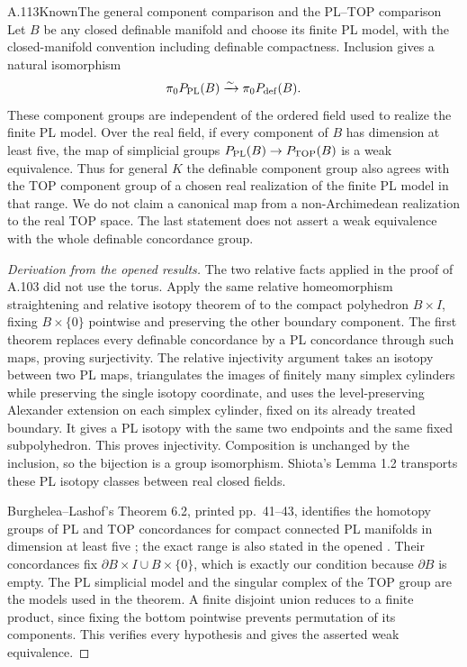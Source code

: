 \begin{saresult}{A.113}{Known}{The general component comparison and the PL--TOP comparison}
Let $B$ be any closed definable manifold and choose its finite PL
model, with the closed-manifold convention including definable
compactness. Inclusion gives a natural isomorphism
\[
 \pi_0P_{\rm PL}(B)\xrightarrow{\sim}\pi_0P_{\rm def}(B).
\]
These component groups are independent of the ordered field used
to realize the finite PL model. Over the real field, if every
component of $B$ has dimension at least five, the map of
simplicial groups $P_{\rm PL}(B)\to P_{\rm TOP}(B)$ is a weak
equivalence. Thus for general $K$ the definable component group
also agrees with the TOP component group of a chosen real
realization of the finite PL model in that range. We do not claim
a canonical map from a non-Archimedean realization to the real
TOP space.
The last statement does not assert a weak equivalence with the
whole definable concordance group.
\end{saresult}
\begin{proof}[Derivation from the opened results]
The two relative facts applied in the proof of A.103 did not use
the torus. Apply the same relative homeomorphism straightening
and relative isotopy theorem of \cite[Theorem 2.1 with complement;
Lemma 3.3, pp.~44--46]{Shiota2010} to the compact polyhedron
$B\times I$, fixing $B\times\{0\}$ pointwise and preserving the
other boundary component. The first theorem replaces every
definable concordance by a PL concordance through such maps,
proving surjectivity. The relative injectivity argument takes an
isotopy between two PL maps, triangulates the images of finitely
many simplex cylinders while preserving the single isotopy
coordinate, and uses the level-preserving Alexander extension
on each simplex cylinder, fixed on its already treated boundary.
It gives a PL isotopy with the same two endpoints and the same
fixed subpolyhedron. This proves injectivity. Composition is
unchanged by the inclusion, so the bijection is a group
isomorphism. Shiota's Lemma 1.2 transports these PL isotopy
classes between real closed fields.

Burghelea--Lashof's Theorem 6.2, printed pp.~41--43,
identifies the homotopy groups of PL and TOP concordances for
compact connected PL manifolds in dimension at least five
\cite{BurgheleaLashof1974II}; the exact range is also stated in
the opened \cite[Remark 4.7, p.~35]{GoodwillieKrannichKupers2023}.
Their concordances fix $\partial B\times I\cup B\times\{0\}$,
which is exactly our condition because $\partial B$ is empty.
The PL simplicial model and the singular complex of the TOP
group are the models used in the theorem. A finite disjoint
union reduces to a finite product, since fixing the bottom
pointwise prevents permutation of its components. This verifies
every hypothesis and gives the asserted weak equivalence.
\end{proof}

